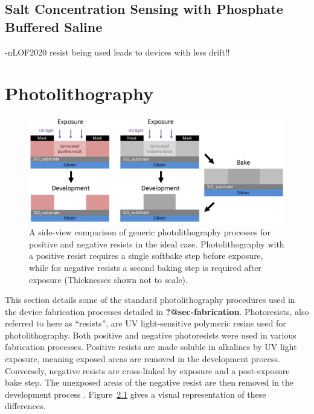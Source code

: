 \documentclass[
  a4paper,
]{scrbook}
\begin{document}
\hypertarget{sec-dummy-sensing}{%
\section{Salt Concentration Sensing with Phosphate Buffered
Saline}\label{sec-dummy-sensing}}

-nLOF2020 resist being used leads to devices with less drift!!

\appendix
{}

\hypertarget{sec-photolithography}{%
\chapter{Photolithography}\label{sec-photolithography}}

\begin{figure}

{\centering \includegraphics{./figures/app1/positive-negative-photolithography.png}

}

\caption{\label{fig-photolithography-types}A side-view comparison of
generic photolithography processes for positive and negative resists in
the ideal case. Photolithography with a positive resist requires a
single softbake step before exposure, while for negative resists a
second baking step is required after exposure (Thicknesses shown not to
scale).}

\end{figure}

This section details some of the standard photolithography procedures
used in the device fabrication processes detailed in
\textbf{?@sec-fabrication}. Photoresists, also referred to here as
``resists'', are UV light-sensitive polymeric resins used for
photolithography. Both positive and negative photoresists were used in
various fabrication processes. Positive resists are made soluble in
alkalines by UV light exposure, meaning exposed areas are removed in the
development process. Conversely, negative resists are cross-linked by
exposure and a post-exposure bake step. The unexposed areas of the
negative resist are then removed in the development process
\autocite{Microchemicals}. Figure~\ref{fig-photolithography-types} gives
a visual representation of these differences.
\end{document}

